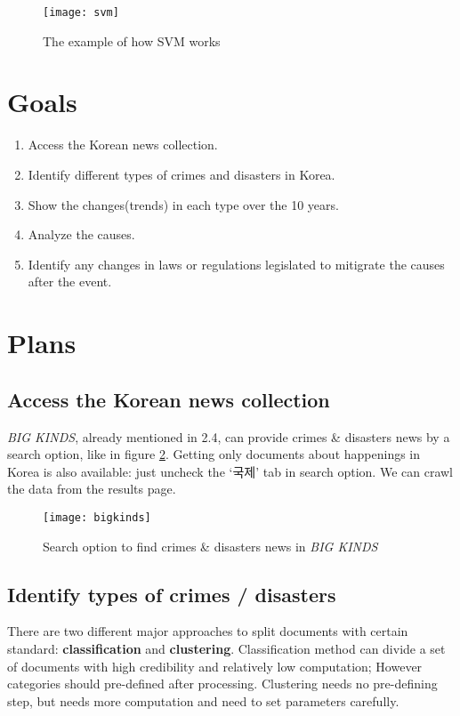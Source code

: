 \documentclass{article}
\begin{document}
\begin{figure}[!htbp]
  \centering
  \texttt{[image: svm]}
  \caption{The example of how SVM works}
  \label{fig:svm}
\end{figure}

\section{Goals}

\begin{enumerate}
  \item Access the Korean news collection.
  \item Identify different types of crimes and disasters in Korea.
  \item Show the changes(trends) in each type over the 10 years.
  \item Analyze the causes.
  \item Identify any changes in laws or regulations
  legislated to mitigrate the causes after the event.
\end{enumerate}

\section{Plans}

\subsection{Access the Korean news collection}
\textit{BIG KINDS}\cite{bigkinds}, already mentioned in 2.4,
can provide crimes \& disasters news by a search option,
like in figure \ref{fig:bigkinds}.
Getting only documents about happenings in Korea is also available:
just uncheck the `국제' tab in search option.
We can crawl the data from the results page.

\begin{figure}[!htbp]
  \centering
  \texttt{[image: bigkinds]}
  \caption{Search option to find crimes \& disasters news in \textit{BIG KINDS}}
  \label{fig:bigkinds}
\end{figure}

\subsection{Identify types of crimes / disasters}

There are two different major approaches to split documents with
certain standard: \textbf{classification} and \textbf{clustering}.
Classification method can divide a set of documents
with high credibility and relatively low computation;
However categories should pre-defined after processing.
Clustering needs no pre-defining step, but needs more computation
and need to set parameters carefully.
\end{document}
